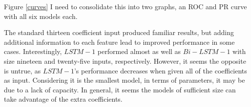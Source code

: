 Figure \ref{curves} I need to consolidate this into two graphs, an ROC and PR curve with all six models each.  

The standard thirteen coefficient input produced familiar results, but adding additional information to each feature lead to improved performance in some cases. Interestingly, $LSTM-1$ performed almost as well as $Bi-LSTM-1$ with size nineteen and twenty-five inputs, respectively. However, it seems the opposite is untrue, as $LSTM-1$'s performance decreases when given all of the coefficients as input. Considering it is the smallest model, in terms of parameters, it may be due to a lack of capacity. In general, it seems the models of sufficient size can take advantage of the extra coefficients. 

